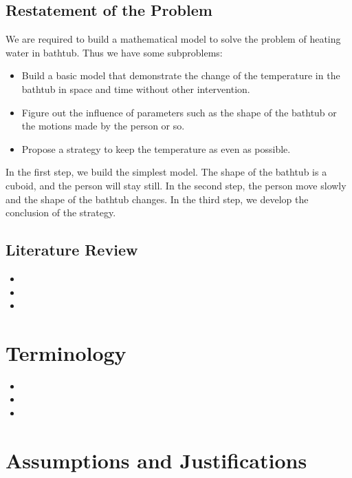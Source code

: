 \documentclass[12pt,a4paper,titlepage]{article}
\begin{document}
\subsection{Restatement of the Problem}
\label{sec:restatement-of-the-problem}
We are required to build a mathematical model to solve the problem of heating water in bathtub. Thus we have some subproblems:
\begin{itemize}
\item Build a basic model that demonstrate the change of the temperature in the bathtub in space and time without other intervention.
\item Figure out the influence of parameters such as the shape of the bathtub or the motions made by the person or so.
\item Propose a strategy to keep the temperature as even as possible.
\end{itemize}
In the first step, we build the simplest model. The shape of the bathtub is a cuboid, and the person will stay still. In the second step, the person move slowly and the shape of the bathtub changes. In the third step, we develop the conclusion of the  strategy.
\subsection{Literature Review}
\label{sec:literature-review}

\begin{itemize}
\item
\item
\item
\end{itemize}

\section{Terminology}
\label{sec:terminology}

\begin{itemize}
\item
\item
\item
\end{itemize}

\section{Assumptions and Justifications}
\label{sec:assumptions-and-justifications}
\end{document}
